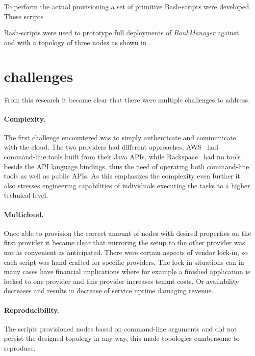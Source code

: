 To perform the actual provisioning a set of primitive Bash-scripts were developed.
These scripts 

Bash-scripts were used to prototype full deployments of \emph{BankManager} against 
and 
with a topology of three nodes as shown in .

\section{challenges}

From this research it became clear that there were multiple challenges to address.

\paragraph{Complexity.} 

The first challenge encountered was to simply
authenticate and communicate with the cloud. The two providers 
had different approaches, AWS~\cite{aws} had command-line tools built from their Java APIs,
while Rackspace~\cite{rackspace} had no tools beside the API language bindings,
thus the need of operating both command-line tools as well as public APIs.
As this emphasizes the complexity even further it also stresses engineering capabilities
of individuals executing the tasks to a higher technical level.

\paragraph{Multicloud.}

Once able to provision the correct amount of nodes with desired properties
on the first provider it became clear that mirroring the setup to the other provider 
was not as convenient as anticipated.
There were certain aspects of vendor lock-in, so each script was hand-crafted for specific providers.
The lock-in situations can in many cases have financial implications where for example
a finished application is locked to one provider and this provider increases tenant costs.
Or availability decreases and results in decrease of service uptime damaging revenue.

\paragraph{Reproducibility.}

The scripts provisioned nodes based on command-line arguments
and did not persist the designed topology in any way, this made topologies cumbersome to reproduce.

